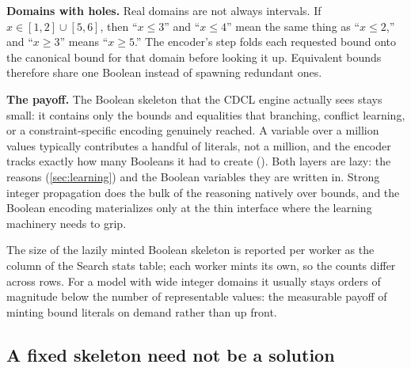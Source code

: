 \textbf{Domains with holes.} Real domains are not always intervals. If
$x \in [1,2] \cup [5,6]$, then ``$x \le 3$'' and ``$x \le 4$'' mean the same
thing as ``$x \le 2$,'' and ``$x \ge 3$'' means ``$x \ge 5$.'' The encoder's
 step folds each requested bound onto
the canonical bound for that domain before looking it up. Equivalent bounds
therefore share one Boolean instead of spawning redundant ones.

\textbf{The payoff.} The Boolean skeleton that the CDCL engine actually sees
stays small: it contains only the bounds and equalities that branching,
conflict learning, or a constraint-specific encoding genuinely reached. A
variable over a million values typically contributes a handful of literals, not
a million, and the encoder tracks exactly how many Booleans it had to create
(). Both layers are lazy: the reasons
(\cref{sec:learning}) and the Boolean variables they are written in.
Strong integer propagation does
the bulk of the reasoning natively over bounds, and the Boolean encoding
materializes only at the thin interface where the learning machinery needs to
grip.

\begin{platypuslog}[htb]
The size of the lazily minted Boolean skeleton is reported per worker as the
 column of the \textsf{Search stats} table; each worker mints its own,
so the counts differ across rows. For a model with wide integer domains it usually
stays orders of magnitude below the number of representable values: the measurable
payoff of minting bound literals on demand rather than up front.
\end{platypuslog}

\subsection{A fixed skeleton need not be a solution}\label{sec:completion}

